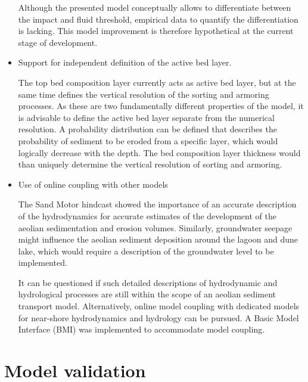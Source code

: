 \begin{itemize}
  Although the presented model conceptually allows to differentiate
  between the impact and fluid threshold, empirical data to quantify
  the differentiation is lacking. This model improvement is therefore
  hypothetical at the current stage of development.

\item Support for independent definition of the active bed layer.

  The top bed composition layer currently acts as active bed layer,
  but at the same time defines the vertical resolution of the sorting
  and armoring processes. As these are two fundamentally different
  properties of the model, it is advisable to define the active bed
  layer separate from the numerical resolution. A probability
  distribution can be defined that describes the probability of
  sediment to be eroded from a specific layer, which would logically
  decrease with the depth. The bed composition layer thickness would
  than uniquely determine the vertical resolution of sorting and
  armoring.

\item Use of online coupling with other models

  The Sand Motor hindcast showed the importance of an accurate
  description of the hydrodynamics for accurate estimates of the
  development of the aeolian sedimentation and erosion
  volumes. Similarly, groundwater seepage might influence the aeolian
  sediment deposition around the lagoon and dune lake, which would
  require a description of the groundwater level to be implemented.

  It can be questioned if such detailed descriptions of hydrodynamic
  and hydrological processes are still within the scope of an aeolian
  sediment transport model. Alternatively, online model coupling with
  dedicated models for near-shore hydrodynamics and hydrology can be
  pursued. A Basic Model Interface (BMI) was implemented to
  accommodate model coupling.

\end{itemize}

\section{Model validation}


